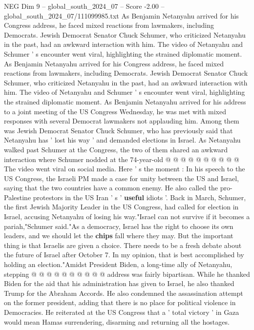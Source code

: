 \begin{textsample}{NEG Dim 9 – global\_south\_2024\_07 – Score -2.00 – global\_south\_2024\_07/111099985.txt}  \label{ex:f9_neg_348}
As Benjamin Netanyahu arrived for his Congress address, he faced mixed reactions from lawmakers, including Democrats.
Jewish Democrat Senator Chuck Schumer, who criticized Netanyahu in the past, had an awkward interaction with him.
The video of Netanyahu and Schumer ' s encounter went viral, highlighting the strained diplomatic moment.
As Benjamin Netanyahu arrived for his Congress address, he faced mixed reactions from lawmakers, including Democrats.
Jewish Democrat Senator Chuck Schumer, who criticized Netanyahu in the past, had an awkward interaction with him.
The video of Netanyahu and Schumer ' s encounter went viral, highlighting the strained diplomatic moment.
As Benjamin Netanyahu arrived for his address to a joint meeting of the US Congress Wednesday, he was met with mixed responses with several Democrat lawmakers not applauding him.
Among them was Jewish Democrat Senator Chuck Schumer, who has previously said that Netanyahu has ' lost his way ' and demanded elections in Israel.
As Netanyahu walked past Schumer at the Congress, the two of them shared an awkward interaction where Schumer nodded at the 74-year-old @ @ @ @ @ @ @ @ @ @ The video went viral on social media.
Here ' s the moment : In his speech to the US Congress, the Israeli PM made a case for unity between the US and Israel, saying that the two countries have a common enemy.
He also called the pro-Palestine protestors in the US Iran ' s ' \textbf{useful} idiots '.
Back in March, Schumer, the first Jewish Majority Leader in the US Congress, had called for election in Israel, accusing Netanyahu of losing his way."Israel can not survive if it becomes a pariah,"Schumer said."As a democracy, Israel has the right to choose its own leaders, and we should let the \textbf{chips} fall where they may.
But the important thing is that Israelis are given a choice.
There needs to be a fresh debate about the future of Israel after October 7.
In my opinion, that is best accomplished by holding an election."Amidst President Biden, a long-time ally of Netanyahu, stepping @ @ @ @ @ @ @ @ @ @ address was fairly bipartisan.
While he thanked Biden for the aid that his administration has given to Israel, he also thanked Trump for the Abraham Accords.
He also condemned the assassination attempt on the former president, adding that there is no place for political violence in Democracies.
He reiterated at the US Congress that a ' total victory ' in Gaza would mean Hamas surrendering, disarming and returning all the hostages.

\end{textsample}
